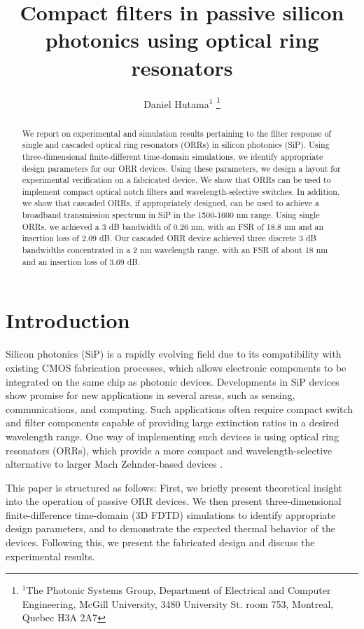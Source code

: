 \documentclass[letterpaper, 10 pt, conference]{ieeeconf}
\title{\LARGE \bf
Compact filters in passive silicon photonics using optical ring resonators
}
\author{Daniel Hutama$^{1}$ %
\thanks{$^{1}$The Photonic Systems Group, Department of Electrical and Computer Engineering, McGill University, 3480 University St. room 753, Montreal, Quebec H3A 2A7}
}
\begin{document}
\maketitle
\thispagestyle{empty}
\pagestyle{empty}


\begin{abstract}


We report on experimental and simulation results pertaining to the filter response of single and cascaded optical ring resonators (ORRs) in silicon photonics (SiP). Using three-dimensional finite-different time-domain simulations, we identify appropriate design parameters for our ORR devices. Using these parameters, we design a layout for experimental verification on a fabricated device. We show that ORRs can be used to implement compact optical notch filters and wavelength-selective switches. In addition, we show that cascaded ORRs, if appropriately designed, can be used to achieve a broadband transmission spectrum in SiP in the 1500-1600 nm range. Using single ORRs, we achieved a 3 dB bandwidth of 0.26 nm, with an FSR of 18.8 nm and an insertion loss of 2.09 dB. Our cascaded ORR device achieved three discrete 3 dB bandwidths concentrated in a 2 nm wavelength range, with an FSR of about 18 nm and an insertion loss of 3.69 dB.

\end{abstract}


\section{Introduction}

Silicon photonics (SiP) is a rapidly evolving field due to its compatibility with existing CMOS fabrication processes, which allows electronic components to be integrated on the same chip as photonic devices. Developments in SiP devices show promise for new applications in several areas, such as sensing, communications, and computing. Such applications often require compact switch and filter components capable of providing large extinction ratios in a desired wavelength range. One way of implementing such devices is using optical ring resonators (ORRs), which provide a more compact and wavelength-selective alternative to larger Mach Zehnder-based devices \cite{SIPORR}. 

This paper is structured as follows: First, we briefly present theoretical insight into the operation of passive ORR devices. We then present three-dimensional finite-difference time-domain (3D FDTD) simulations to identify appropriate design parameters, and to demonstrate the expected thermal behavior of the devices. Following this, we present the fabricated design and discuss the experimental results.
\end{document}

